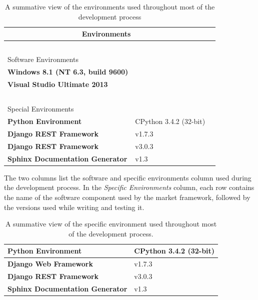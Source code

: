 \documentclass[bsc,frontabs,twoside,singlespacing,parskip,deptreport]{infthesis}     %
\begin{document}
\begin {table}
\caption{A summative view of the environments used throughout most of the development process}

\begin{tabular}{llr}

\multicolumn{2}{c}{Environments}  \\
\hline
\    \\
Software Environments       \\
\hline
\textbf{Windows 8.1 (NT 6.3, build 9600)} \\
 \textbf{Visual Studio Ultimate 2013}   \\
\hline
\     \\

Special Environments \\
\hline

 \textbf{Python Environment} & CPython 3.4.2 (32-bit)      \\
 \textbf{Django REST Framework}  & v1.7.3      \\
   \textbf{Django REST Framework} & v3.0.3     \\
  \textbf{Sphinx Documentation Generator}                & v1.3         \\
\hline
\end{tabular}
\hfill
\label{tab:dev-env}

{The two columns list the software  and specific environments column used during the development process. In the {\it Specific Environments} column, each row contains the name of the software component used by the market framework, followed by the versions used while writing and testing it. }
\end{table}

\begin{table}[h]
\centering
\caption{A summative view of the specific environment used throughout most of the development process.}

\begin{tabular}{|l|l|}
\hline
\textbf{Python Environment}    & CPython 3.4.2 (32-bit)          \\ \hline
\textbf{Django Web Framework}  & v1.7.3                         \\ \hline
\textbf{Django REST Framework} & v3.0.3                            \\ \hline
\textbf{Sphinx Documentation Generator}                & v1.3                          \\ \hline
\end{tabular}
\label{tab:dev-env}
 
\end{table}
\end{document}
